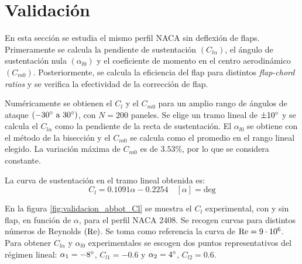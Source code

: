 
\section{Validación}

En esta sección se estudia el mismo perfil NACA sin deflexión de flaps. Primeramente se calcula la pendiente de sustentación $\left( C_{l\alpha} \right)$, el ángulo de sustentación nula $\left( \alpha_{l0} \right)$ y el coeficiente de momento en el centro aerodinámico $\left( C_{m0} \right)$. Posteriormente, se calcula la eficiencia del flap para distintos \emph{flap-chord ratios} y se verifica la efectividad de la corrección de flap.

Numéricamente se obtienen el $C_l$ y el $C_{m0}$ para un amplio rango de ángulos de ataque $\left( -30 \mathrm{^{\circ}} \text{ a } 30 \mathrm{^{\circ}} \right)$, con $N = 200$ paneles. Se elige un tramo lineal de $\pm 10\mathrm{^{\circ}}$ y se calcula el $C_{l\alpha}$ como la pendiente de la recta de sustentación. El $\alpha_{l0}$ se obtiene con el método de la bisección y el $C_{m0}$ se calcula como el promedio en el rango lineal elegido. La variación máxima de $C_{m0}$ es de $3.53\%$, por lo que se considera constante.

La curva de sustentación en el tramo lineal obtenida es:
\begin{equation}
    C_l = 0.1091 \alpha - 0.2254 \quad
    \left[ \alpha \right] = \mathrm{deg}
\end{equation}

En la figura \ref{fig:validacion_abbot_Cl} se muestra el $C_l$ experimental, con y sin flap, en función de $\alpha$, para el perfil NACA 2408. Se recogen curvas para distintos números de Reynolds $\left( \mathrm{Re} \right)$. Se toma como referencia la curva de $\mathrm{Re} = 9 \cdot 10^6$. Para obtener $C_{l\alpha}$ y $\alpha_{l0}$ experimentales se escogen dos puntos representativos del régimen lineal: $\alpha_1 = -8\mathrm{^{\circ}}$, $C_{l1} = -0.6$ y $\alpha_2 = 4\mathrm{^{\circ}}$, $C_{l2} = 0.6$. 

